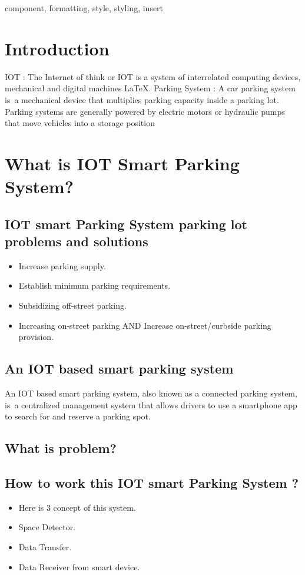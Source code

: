 \documentclass[conference]{IEEEtran}
\begin{document}
\begin{IEEEkeywords}
component, formatting, style, styling, insert
\end{IEEEkeywords}

\section{Introduction}
IOT : The Internet of think or IOT is a system of interrelated computing devices, mechanical and digital machines \LaTeX.
 Parking System : A car parking system is a mechanical device that multiplies parking capacity inside a parking lot. Parking systems are generally powered by electric motors or hydraulic pumps that move vehicles into a storage position
 

\section{What is IOT Smart Parking System?}\label{AA}

\subsection{IOT smart Parking System parking lot problems and solutions}
\begin{itemize}
\item Increase parking supply.
\item Establish minimum parking requirements.
\item Subsidizing off-street parking.
\item Increasing on-street parking AND
Increase on-street/curbside parking provision.

\end{itemize}

\subsection{An IOT based smart parking system}
An IOT based smart parking system, also known as
 a connected parking system, is a centralized
 management system that allows drivers to use
 a smartphone app to search for and reserve
 a parking spot.

\subsection{What is problem?}\label{AA}

\subsection{How to work this IOT smart Parking System ?}
\begin{itemize}
\item Here is 3 concept of this system.
\item Space Detector.
\item Data Transfer.
\item Data Receiver from smart device.

\end{itemize}
\end{document}
